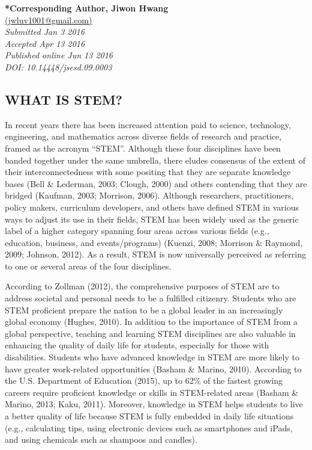 \documentclass[11.5pt]{sig-alternate} %
\begin{document}
\textbf{*Corresponding Author, Jiwon Hwang}\\
\href{mailto: jwluv1001@gmail.com }{(jwluv1001@gmail.com)} \\
\textit{Submitted Jan 3 2016 }\\
\textit{Accepted  Apr 13 2016} \\
\textit{Published online Jun 13 2016} \\
\textit{DOI: 10.14448/jsesd.09.0003} \\
\pagebreak
\clearpage
\begin{large}
\section*{WHAT IS STEM?}

In recent years there has been increased attention paid to science, technology, engineering, and mathematics across diverse fields of research and practice, framed as the acronym “STEM”.  Although these four disciplines have been banded together under the same umbrella, there eludes consensus of the extent of their interconnectedness with some positing that they are separate knowledge bases (Bell \& Lederman, 2003; Clough, 2000) and others contending that they are bridged (Kaufman, 2003; Morrison, 2006).  Although researchers, practitioners, policy makers, curriculum developers, and others have defined STEM in various ways to adjust its use in their fields, STEM has been widely used as the generic label of a higher category spanning four areas across various fields (e.g., education, business, and events/programs) (Kuenzi, 2008; Morrison \& Raymond, 2009; Johnson, 2012).  As a result, STEM is now universally perceived as referring to one or several areas of the four disciplines. 

According to Zollman (2012), the comprehensive purposes of STEM are to address societal and personal needs to be a fulfilled citizenry.  Students who are STEM proficient prepare the nation to be a global leader in an increasingly global economy (Hughes, 2010).  In addition to the importance of STEM from a global perspective, teaching and learning STEM disciplines are also valuable in enhancing the quality of daily life for students, especially for those with disabilities.  Students who have advanced knowledge in STEM are more likely to have greater work-related opportunities (Basham \& Marino, 2010). According to the U.S. Department of Education (2015), up to 62\% of the fastest growing careers require proficient knowledge or skills in STEM-related areas (Basham \& Marino, 2013; Kaku, 2011).  Moreover, knowledge in STEM helps students to live a better quality of life because STEM is fully embedded in daily life situations (e.g., calculating tips, using electronic devices such as smartphones and iPads, and using chemicals such as shampoos and candles).


\end{large}
\end{document}
